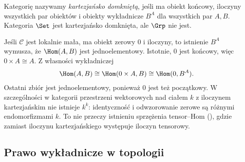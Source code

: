 \begin{definicja}
Kategorię nazywamy \emph{kartezjańsko domkniętą}, jeśli ma obiekt końcowy, iloczyny wszystkich par obiektów i obiekty wykładnicze $B^A$ dla wszystkich par $A,B$. Kategoria $\Set$ jest kartezjańsko domknięta, ale $\Grp$ nie jest.
\end{definicja}

\begin{przyklad}\label{cat:ex:exp-zero}
Jeśli $\mathcal C$ jest lokalnie mała, ma obiekt zerowy $0$ i iloczyny, to istnienie $B^A$ wymusza, że $\Hom(A,B)$ jest jednoelementowy. Istotnie, $0$ jest końcowy, więc $0\times A\cong A$. Z własności wykładniczej
\[
\Hom(A,B)\cong\Hom(0\times A,B)\cong\Hom(0,B^A).
\]
Ostatni zbiór jest jednoelementowy, ponieważ $0$ jest też początkowy. W szczególności w kategorii przestrzeni wektorowych nad ciałem $k$ z iloczynem kartezjańskim nie istnieje $k^k$: identyczność i odwzorowanie zerowe są różnymi endomorfizmami $k$. To nie przeczy istnieniu sprzężenia tensor--Hom (), gdzie zamiast iloczynu kartezjańskiego występuje iloczyn tensorowy.
\end{przyklad}

\subsection{Prawo wykładnicze w topologii}

